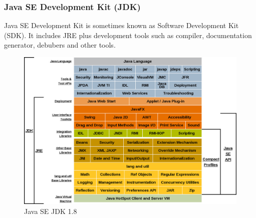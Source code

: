 \subsubsection{Java SE Development Kit (JDK)}
Java SE Development Kit is sometimes known as Software Development Kit (SDK). It includes JRE plus development tools such as compiler, documentation generator, debubers and other tools.
\\
\begin{figure}[h!]
    \centering
    \includegraphics[scale=0.35]{fig/java_jdk.jpg}
    \caption{Java SE JDK 1.8 \cite{Java8Doc}}
    \label{jdk}
\end{figure}





